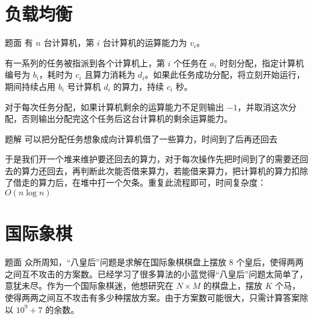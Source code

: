 \documentclass{pptt}
\begin{document}
\section{负载均衡}

\begin{frame}{题面}
    有 $n$ 台计算机，第 $i$ 台计算机的运算能力为 $v_i$。

    有一系列的任务被指派到各个计算机上，第 $i$ 个任务在 $a_i$ 时刻分配，指定计算机编号为 $b_i$，耗时为 $c_i$ 且算力消耗为 $d_i$。如果此任务成功分配，将立刻开始运行，期间持续占用 $b_i$ 号计算机 $d_i$ 的算力，持续 $c_i$ 秒。

    对于每次任务分配，如果计算机剩余的运算能力不足则输出 $-1$，并取消这次分配，否则输出分配完这个任务后这台计算机的剩余运算能力。
\end{frame}

\begin{frame}{题解}
    可以把分配任务想象成向计算机借了一些算力，时间到了后再还回去

    于是我们开一个堆来维护要还回去的算力，对于每次操作先把时间到了的需要还回去的算力还回去，再判断此次能否借来算力，若能借来算力，把计算机的算力扣除了借走的算力后，在堆中打一个欠条。重复此流程即可，时间复杂度：$O(n \log n)$
\end{frame}

\section{国际象棋}

\begin{frame}{题面}
    众所周知，“八皇后”问题是求解在国际象棋棋盘上摆放 $8$ 个皇后，使得两两之间互不攻击的方案数。已经学习了很多算法的小蓝觉得“八皇后”问题太简单了，意犹未尽。作为一个国际象棋迷，他想研究在 $N \times M$ 的棋盘上，摆放 $K$ 个马，使得两两之间互不攻击有多少种摆放方案。由于方案数可能很大，只需计算答案除以 ${10}^9+7$ 的余数。
\end{frame}
\end{document}

